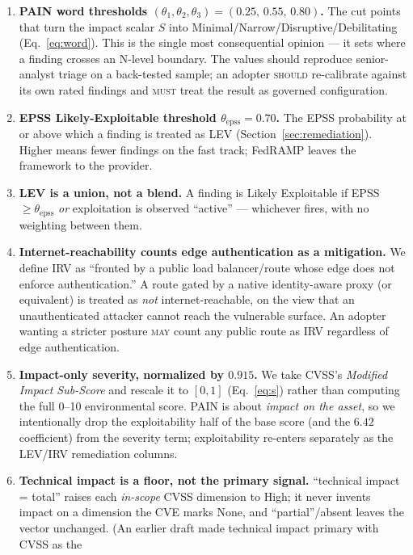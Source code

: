 \documentclass[11pt]{article}
\newcommand{\rfckw}[1]{\textsc{#1}}
\begin{document}
\begin{enumerate}[leftmargin=1.7em]
\item \textbf{PAIN word thresholds $(\theta_1,\theta_2,\theta_3) = (0.25,\,0.55,\,0.80)$.}
  The cut points that turn the impact scalar $S$ into
  Minimal/Narrow/Disruptive/Debilitating (Eq.~\ref{eq:word}). This is the single most
  consequential opinion --- it sets where a finding crosses an N-level boundary. The
  values should reproduce senior-analyst triage on a back-tested sample; an adopter
  \rfckw{should} re-calibrate against its own rated findings and \rfckw{must} treat
  the result as governed configuration.
\item \textbf{EPSS Likely-Exploitable threshold $\theta_{\text{epss}} = 0.70$.}
  The EPSS probability at or above which a finding is treated as LEV
  (Section~\ref{sec:remediation}). Higher means fewer findings on the fast track;
  FedRAMP leaves the framework to the provider.
\item \textbf{LEV is a union, not a blend.} A finding is Likely Exploitable if
  EPSS $\ge \theta_{\text{epss}}$ \emph{or} exploitation is observed ``active'' ---
  whichever fires, with no weighting between them.
\item \textbf{Internet-reachability counts edge authentication as a mitigation.} We
  define IRV as ``fronted by a public load balancer/route whose edge does not enforce
  authentication.'' A route gated by a native identity-aware proxy (or equivalent) is
  treated as \emph{not} internet-reachable, on the view that an unauthenticated
  attacker cannot reach the vulnerable surface. An adopter wanting a stricter posture
  \rfckw{may} count any public route as IRV regardless of edge authentication.
\item \textbf{Impact-only severity, normalized by $0.915$.} We take CVSS's
  \emph{Modified Impact Sub-Score} and rescale it to $[0,1]$ (Eq.~\ref{eq:s}) rather
  than computing the full 0--10 environmental score. PAIN is about \emph{impact on the
  asset}, so we intentionally drop the exploitability half of the base score (and the
  $6.42$ coefficient) from the severity term; exploitability re-enters separately as
  the LEV/IRV remediation columns.
\item \textbf{Technical impact is a floor, not the primary signal.} ``technical
  impact = total'' raises each \emph{in-scope} CVSS dimension to High; it never
  invents impact on a dimension the CVE marks None, and ``partial''/absent leaves the
  vector unchanged. (An earlier draft made technical impact primary with CVSS as the

\end{enumerate}
\end{document}
